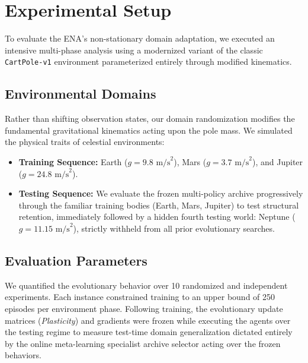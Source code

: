 \section{Experimental Setup}

To evaluate the ENA's non-stationary domain adaptation, we executed an intensive multi-phase analysis using a modernized variant of the classic \texttt{CartPole-v1} environment parameterized entirely through modified kinematics.

\subsection{Environmental Domains}
Rather than shifting observation states, our domain randomization modifies the fundamental gravitational kinematics acting upon the pole mass. We simulated the physical traits of celestial environments:
\begin{itemize}
    \item \textbf{Training Sequence:} Earth ($g = 9.8 \text{ m/s}^2$), Mars ($g = 3.7 \text{ m/s}^2$), and Jupiter ($g = 24.8 \text{ m/s}^2$).
    \item \textbf{Testing Sequence:} We evaluate the frozen multi-policy archive progressively through the familiar training bodies (Earth, Mars, Jupiter) to test structural retention, immediately followed by a hidden fourth testing world: Neptune ($g = 11.15 \text{ m/s}^2$), strictly withheld from all prior evolutionary searches.
\end{itemize}

\subsection{Evaluation Parameters}
We quantified the evolutionary behavior over 10 randomized and independent experiments. Each instance constrained training to an upper bound of 250 episodes per environment phase. Following training, the evolutionary update matrices (\textit{Plasticity}) and gradients were frozen while executing the agents over the testing regime to measure test-time domain generalization dictated entirely by the online meta-learning specialist archive selector acting over the frozen behaviors.

